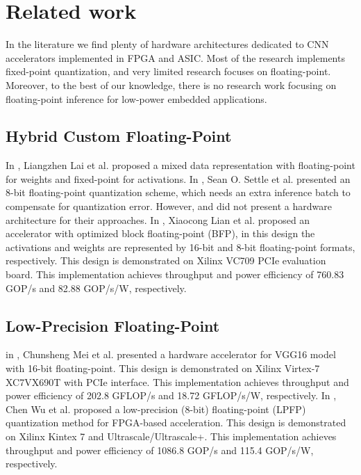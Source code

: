 \section{Related work}
\label{sec:related_work}
In the literature we find plenty of hardware architectures
dedicated to CNN accelerators implemented in FPGA and ASIC. Most of the research implements fixed-point quantization, and very limited research focuses on floating-point. Moreover, to the best of our knowledge, there is no research work focusing on floating-point inference for low-power embedded applications.


\subsection{Hybrid Custom Floating-Point}
In \cite{lai2017deep}, Liangzhen Lai et al. proposed a mixed data representation with floating-point for weights and fixed-point for activations. In \cite{settle2018quantizing}, Sean O. Settle et al. presented an 8-bit floating-point quantization scheme, which needs an extra inference batch to compensate for quantization error. However, \cite{lai2017deep} and \cite{settle2018quantizing} did not present a hardware architecture for their approaches. In \cite{lian2019high}, Xiaocong Lian et al. proposed an accelerator with optimized block floating-point (BFP), in this design the activations and weights are represented by 16-bit and 8-bit floating-point formats, respectively. This design is demonstrated on Xilinx VC709 PCIe evaluation board. This implementation achieves throughput and power efficiency of 760.83 GOP/s and 82.88 GOP/s/W, respectively.

\subsection{Low-Precision Floating-Point}
in \cite{mei2017200mhz}, Chunsheng Mei et al. presented a hardware accelerator for VGG16 model with 16-bit floating-point. This design is demonstrated on Xilinx Virtex-7 XC7VX690T with PCIe interface. This implementation achieves throughput and power efficiency of 202.8 GFLOP/s and 18.72 GFLOP/s/W, respectively. In \cite{wu2021low}, Chen Wu et al. proposed a low-precision (8-bit) floating-point (LPFP) quantization method for FPGA-based acceleration. This design is demonstrated on Xilinx Kintex 7 and Ultrascale/Ultrascale+. This implementation achieves throughput and power efficiency of 1086.8 GOP/s and 115.4 GOP/s/W, respectively.

